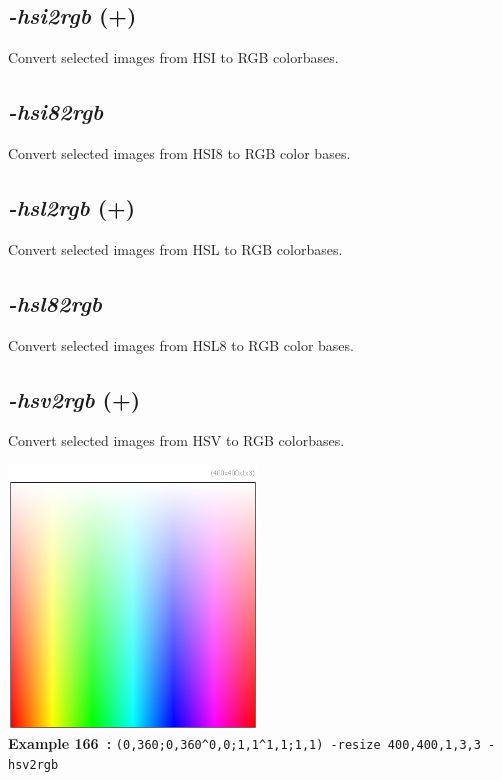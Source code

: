 \documentclass[a4paper,11pt,twoside]{book}
\begin{document}
\subsection{\emph{-hsi2rgb} (+)}\vspace*{-0.5em}
Convert selected images from HSI to RGB colorbases.


\subsection{\emph{-hsi82rgb} }\vspace*{-0.5em}
Convert selected images from HSI8 to RGB color bases.


\subsection{\emph{-hsl2rgb} (+)}\vspace*{-0.5em}
Convert selected images from HSL to RGB colorbases.


\subsection{\emph{-hsl82rgb} }\vspace*{-0.5em}
Convert selected images from HSL8 to RGB color bases.


\subsection{\emph{-hsv2rgb} (+)}\vspace*{-0.5em}
Convert selected images from HSV to RGB colorbases.
\begin{center}\includegraphics[keepaspectratio=true,height=7cm,width=\textwidth]{img/gmic_def166.jpg}\\
{\footnotesize \textbf{Example 166~:} \texttt{(0,360;0,360\textasciicircum 0,0;1,1\textasciicircum 1,1;1,1) -resize 400,400,1,3,3 -hsv2rgb}}
\end{center}
\end{document}
